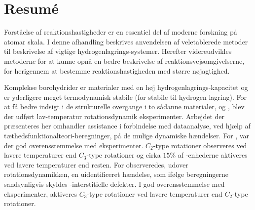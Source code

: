  

\chapter*{Resum\'e}


Forståelse af reaktionshastigheder er en essentiel del af moderne forskning på atomar skala.
I denne afhandling beskrives anvendelsen af veletablerede metoder til beskrivelse af vigtige hydrogenlagrings-systemer. Herefter videreudvikles metoderne for at kunne opnå en bedre beskrivelse af reaktionsvejsomgivelserne, for herigennem at bestemme reaktionshastigheden med større nøjagtighed.

Komplekse borohydrider er materialer med en høj hydrogenlagrings-kapacitet og er yderligere meget termodynamisk stabile (for stabile til hydrogen lagring).
For at få bedre indsigt i de strukturelle overgange i to sådanne materialer,  og , blev der udført lav-temperatur rotationsdynamik eksperimenter.
Arbejdet der præsenteres her omhandler assistance i forbindelse med dataanalyse, ved hjælp af tæthedsfunktionalteori-beregninger, på de mulige dynamiske hændelser.
For , var der god overensstemmelse med eksperimenter. $C_2$-type rotationer observeres ved lavere temperaturer end $C_3$-type rotationer og cirka $15\%$ af -enhederne aktiveres ved lavere temperaturer end resten.
For  observeredes, udover rotationsdynamikken, en uidentificeret hændelse, som ifølge beregningerne sandsynligvis skyldes -interstitielle defekter.
I god overensstemmelse med eksperimenter, aktiveres $C_3$-type rotationer ved lavere temperaturer end $C_2$-type rotationer.

